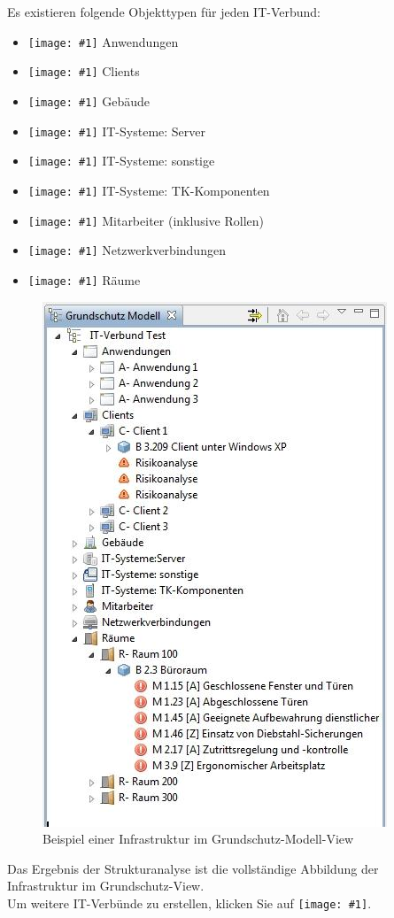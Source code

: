\documentclass[a4paper,10pt]{book}
\newcommand{\icon}[1]{\texttt{[image: \#1]}}
\begin{document}
\newline
Es existieren folgende Objekttypen für jeden IT-Verbund:
\begin{itemize}
 \item \icon{Icon/Anwendung.png} Anwendungen
 \item \icon{Icon/Clients.png} Clients
 \item \icon{Icon/Gebaeude.png} Gebäude
 \item \icon{Icon/Server.png} IT-Systeme: Server
 \item \icon{Icon/Sonstige.png} IT-Systeme: sonstige
 \item \icon{Icon/Tk_komponenten.png} IT-Systeme: TK-Komponenten
 \item \icon{Icon/Mitarbeiter.png} Mitarbeiter (inklusive Rollen)
 \item \icon{Icon/Netzwerkverbindungen.png} Netzwerkverbindungen
 \item \icon{Icon/Raeume.png} Räume
\end{itemize}
\begin{figure}[htb!]
  \centering
  \includegraphics[scale=.65]{Screenshot/GS_Modell_Baumstruktur.jpg}
  \caption{\label{fig:beispiel-einer-infrastruktur-im-grundschutz-modell-view}
    Beispiel einer Infrastruktur im Grundschutz-Modell-View}
\end{figure}
Das Ergebnis der Strukturanalyse ist die vollständige Abbildung der Infrastruktur im Grundschutz-View.
\newline\\
Um weitere IT-Verbünde zu erstellen, klicken Sie auf \icon{Icon/Oeffnen.png}.
\end{document}
